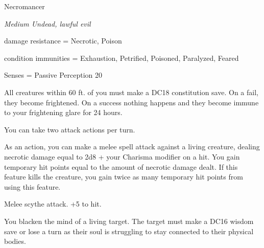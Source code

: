 \begin{monsterbox}{Necromancer}
	\begin{hangingpar}
		\textit{Medium Undead, lawful evil}
	\end{hangingpar}
	\dndline%
	\basics[%
	armorclass = 16,
	hitpoints  = 82,
	speed      = 30 ft
	]
	\dndline%
	\stats[
	STR = \stat{9}, %
	DEX = \stat{12},
	CON = \stat{14},
	INT = \stat{16},
	WIS = \stat{22},
	CHA = \stat{10}
	]
	\dndline%
	\details[%
	languages = {Common, undead},
	challenge = 6
	]
	\dndline%
	damage resistance = Necrotic, Poison
	
	condition immunities = Exhaustion, Petrified, Poisoned, Paralyzed, Feared	
	
	Senses = Passive Perception 20
	
	\dndline%
	\begin{monsteraction}[Horrify]
		All creatures within 60 ft. of you must make a DC18 constitution save. On a fail, they become frightened. On a success nothing happens and they become immune to your frightening glare for 24 hours.
	\end{monsteraction}	
	\begin{monsteraction}[Multiattack]
		You can take two attack actions per turn.
	\end{monsteraction}
	\begin{monsteraction}
		As an action, you can make a melee spell attack against a living creature, dealing necrotic damage equal to 2d8 + your Charisma modifier on a hit. You gain temporary hit points equal to the amount of necrotic damage dealt. If this feature kills the creature, you gain twice as many temporary hit points from using this feature.
	\end{monsteraction}	
	\begin{monsteraction}
		Melee scythe attack. +5 to hit.
	\end{monsteraction}	
	\begin{monsteraction}
		You blacken the mind of a living target. The target must make a DC16 wisdom save or lose a turn as their soul is struggling to stay connected to their physical bodies.
	\end{monsteraction}		
\end{monsterbox}


